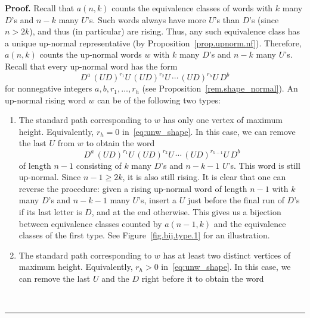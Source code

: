 \documentclass[numbers=enddot,12pt,final,onecolumn,notitlepage]{scrartcl}%
\theoremstyle{definition}
\newenvironment{proof}[1][Proof]{\noindent\textbf{#1.} }{\ \rule{0.5em}{0.5em}}
\begin{document}
\begin{proof}
Recall that $a(n, k)$ counts the equivalence classes of words with $k$ many $D$'s and $n-k$ many $U$'s.
Such words always have more $U$'s than $D$'s (since $n > 2k$), and thus (in particular) are rising.
Thus, any such equivalence class has a unique up-normal representative (by Proposition~\ref{prop.upnorm.nf}).
Therefore, $a(n, k)$ counts the up-normal words $w$ with $k$ many $D$'s and $n-k$ many $U$'s. Recall that every up-normal word has the form
\begin{equation}\label{eq:unw_shape}
D^a\, (UD)^{r_1}U\, (UD)^{r_2}U\, \cdots\, (UD)^{r_h}U\, D^b
\end{equation}
for nonnegative integers $a,b,r_1,\ldots,r_h$ (see Proposition~\ref{rem.shape_normal}). 
An up-normal rising word $w$ can be of the following two types:
\begin{enumerate}[itemindent=.7cm,label=\textbf{Type \arabic*:}]
\item The standard path corresponding to $w$ has only one vertex of maximum height. Equivalently, $r_h = 0$ in~\eqref{eq:unw_shape}. In this case, we can 
remove the last $U$ from $w$ to obtain the word
\[D^a\, (UD)^{r_1}U\, (UD)^{r_2}U\, \cdots\, (UD)^{r_{h-1}}U\, D^b\]
of length $n-1$ consisting of $k$ many $D$'s and $n-k-1$ $U$'s. This word is still up-normal. Since $n-1 \geq 2k$, it is also still rising. It is clear that one can reverse the procedure: given a rising up-normal word of length $n-1$ with $k$ many $D$'s and $n-k-1$ many $U$'s, insert a $U$ just before the final run of $D$'s if its last letter is $D$, and at the end otherwise. This gives us a bijection between equivalence classes counted by $a(n-1,k)$ and the equivalence classes of the first type. See Figure~\ref{fig.bij.type.1} for an illustration.
\item The standard path corresponding to $w$ has at least two distinct vertices of maximum height. Equivalently, $r_h > 0$ in~\eqref{eq:unw_shape}. In this case, we can remove the last $U$ and the $D$ right before it to obtain the word

\end{enumerate}
\end{proof}
\end{document}
